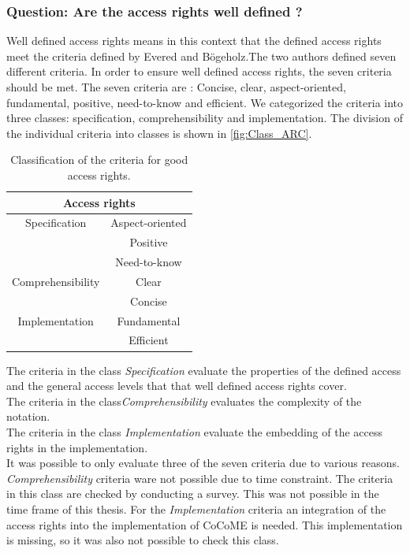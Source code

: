 \subsubsection{Question: Are the access rights well defined ?}
Well defined access rights means in this context that the defined access rights meet the criteria defined by Evered and Bögeholz\cite{CaseStudyAndAccessrigths}.The two authors defined seven different criteria. In order to ensure well defined access rights, the seven criteria should be met. The seven criteria are : Concise, clear, aspect-oriented, fundamental, positive, need-to-know and efficient. We categorized the criteria into three classes: specification, comprehensibility and implementation. The division of the individual criteria into classes is shown in \autoref{fig:Class_ARC}.
\begin{table}
\centering
\begin{tabular}{|c|c|}
\hline 
\multicolumn{2}{|c|}{Access rights} \\ 
\hline 
Specification & Aspect-oriented  \\ 
\hline 
 & Positive  \\ 
\hline 
 & Need-to-know \\ 
\hline 
Comprehensibility & Clear \\ 
\hline 
 & Concise  \\ 
\hline 
Implementation & Fundamental \\ 
\hline 
 & Efficient \\ 
\hline 
\end{tabular} 
\caption{Classification of the criteria for good access rights.}
\label{fig:Class_ARC}
\end{table}
The criteria in the class \textit{Specification} evaluate the properties of the defined access and the general access levels that that well defined access rights cover.\\
The criteria in the class\textit{Comprehensibility} evaluates the complexity of the notation.\\
The criteria in the class \textit{Implementation} evaluate the embedding of the access rights in the implementation.\\
It was possible to only evaluate three of the seven criteria due to various reasons. \textit{Comprehensibility} criteria ware not possible due to time constraint. The criteria in this class are checked by conducting a survey. This was not possible in the time frame of this thesis. For the \textit{Implementation} criteria an integration of the access rights into the implementation of CoCoME is needed. This implementation is missing, so it was also not possible to check this class.\\
